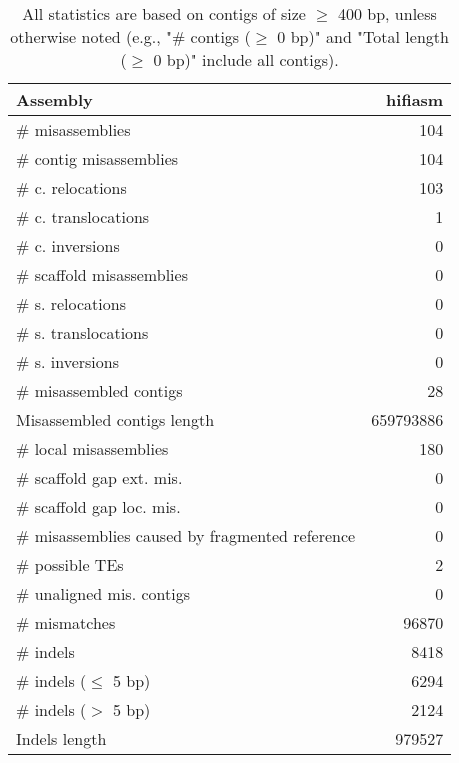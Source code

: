 \documentclass[12pt,a4paper]{article}
\begin{document}
\begin{table}[ht]
\begin{center}
\caption{All statistics are based on contigs of size $\geq$ 400 bp, unless otherwise noted (e.g., "\# contigs ($\geq$ 0 bp)" and "Total length ($\geq$ 0 bp)" include all contigs).}
\begin{tabular}{|l*{1}{|r}|}
\hline
Assembly & hifiasm \\ \hline
\# misassemblies & 104 \\ \hline
\hspace{2mm}\# contig misassemblies & 104 \\ \hline
\hspace{5mm}\# c. relocations & 103 \\ \hline
\hspace{5mm}\# c. translocations & 1 \\ \hline
\hspace{5mm}\# c. inversions & 0 \\ \hline
\hspace{2mm}\# scaffold misassemblies & 0 \\ \hline
\hspace{5mm}\# s. relocations & 0 \\ \hline
\hspace{5mm}\# s. translocations & 0 \\ \hline
\hspace{5mm}\# s. inversions & 0 \\ \hline
\# misassembled contigs & 28 \\ \hline
Misassembled contigs length & 659793886 \\ \hline
\# local misassemblies & 180 \\ \hline
\# scaffold gap ext. mis. & 0 \\ \hline
\# scaffold gap loc. mis. & 0 \\ \hline
\# misassemblies caused by fragmented reference & 0 \\ \hline
\# possible TEs & 2 \\ \hline
\# unaligned mis. contigs & 0 \\ \hline
\# mismatches & 96870 \\ \hline
\# indels & 8418 \\ \hline
\hspace{5mm}\# indels ($\leq$ 5 bp) & 6294 \\ \hline
\hspace{5mm}\# indels ($>$ 5 bp) & 2124 \\ \hline
Indels length & 979527 \\ \hline
\end{tabular}
\end{center}
\end{table}
\end{document}
